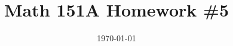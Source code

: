 \documentclass{article}
\date{\today}
\title{Math 151A Homework \#5}
\begin{document}
\maketitle

\bigskip
\begin{prob}
\end{prob}
\end{document}
